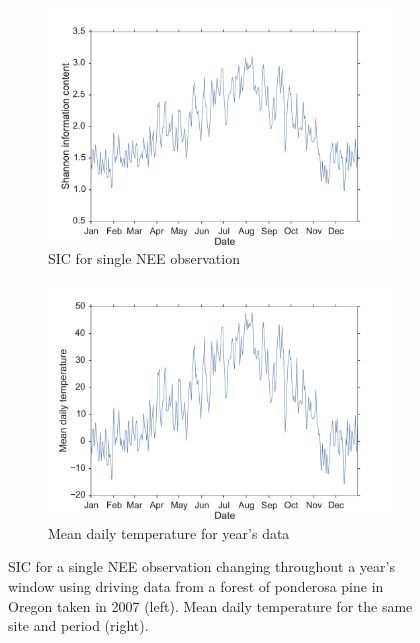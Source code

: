 \documentclass[11pt]{article}
\begin{document}
\begin{figure}[ht]
    \centering
    \begin{subfigure}[b]{0.45\textwidth}
        \includegraphics[width=\textwidth]{oregon2007SICnee.pdf}
        \caption{SIC for single NEE observation}
        \label{fig:sic_nee_oregon2007}
    \end{subfigure}%
    \begin{subfigure}[b]{0.45\textwidth}
        \includegraphics[width=\textwidth]{oregon2007temp.pdf}
        \caption{Mean daily temperature for year's data}
        \label{fig:temp_nee_oregon2007}
    \end{subfigure}
    \caption{SIC for a single NEE observation changing throughout a year's window using driving data from a forest of ponderosa pine in Oregon taken in 2007 (left). Mean daily temperature for the same site and period (right).}
    \label{fig:neeSIC_temp_comp}
\end{figure}
\end{document}
